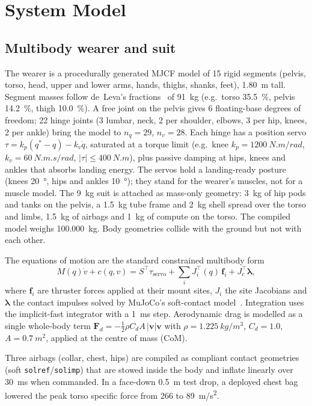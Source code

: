 \documentclass[conference]{IEEEtran}
\newcommand{\vect}[1]{\boldsymbol{#1}}
\begin{document}
\section{System Model}
\label{sec:model}

\subsection{Multibody wearer and suit}
The wearer is a procedurally generated MJCF model of 15 rigid segments (pelvis, torso, head, upper and lower arms, hands, thighs, shanks, feet), \SI{1.80}{m} tall. Segment masses follow de~Leva's fractions~\cite{deleva1996} of \SI{91}{kg} (e.g.\ torso \SI{35.5}{\%}, pelvis \SI{14.2}{\%}, thigh \SI{10.0}{\%}). A free joint on the pelvis gives 6 floating-base degrees of freedom; 22 hinge joints (3 lumbar, neck, 2 per shoulder, elbows, 3 per hip, knees, 2 per ankle) bring the model to $n_q=29$, $n_v=28$. Each hinge has a position servo $\tau = k_p(q^\ast-q) - k_v\dot q$, saturated at a torque limit (e.g.\ knee $k_p=\SI{1200}{N.m/rad}$, $k_v=\SI{60}{N.m.s/rad}$, $|\tau|\le\SI{400}{N.m}$), plus passive damping at hips, knees and ankles that absorbs landing energy. The servos hold a landing-ready posture (knees \SI{20}{\degree}, hips and ankles \SI{10}{\degree}); they stand for the wearer's muscles, not for a muscle model. The \SI{9}{kg} suit is attached as mass-only geometry: \SI{3}{kg} of hip pods and tanks on the pelvis, a \SI{1.5}{kg} tube frame and \SI{2}{kg} shell spread over the torso and limbs, \SI{1.5}{kg} of airbags and \SI{1}{kg} of compute on the torso. The compiled model weighs \SI{100.000}{kg}. Body geometries collide with the ground but not with each other.

The equations of motion are the standard constrained multibody form
\begin{equation}
M(q)\dot v + c(q,v) = S^{\top}\tau_{\text{servo}} + \sum_{i} J_i^{\top}(q)\,\vect f_i + J_c^{\top}\vect\lambda,
\label{eq:eom}
\end{equation}
where $\vect f_i$ are thruster forces applied at their mount sites, $J_i$ the site Jacobians and $\vect\lambda$ the contact impulses solved by MuJoCo's soft-contact model~\cite{todorov2012mujoco}. Integration uses the implicit-fast integrator with a \SI{1}{ms} step. Aerodynamic drag is modelled as a single whole-body term $\vect F_d=-\tfrac12\rho C_d A\,|\vect v|\vect v$ with $\rho=\SI{1.225}{kg/m^3}$, $C_d=1.0$, $A=\SI{0.7}{m^2}$, applied at the centre of mass (CoM).

Three airbags (collar, chest, hips) are compiled as compliant contact geometries (soft \texttt{solref}/\texttt{solimp}) that are stowed inside the body and inflate linearly over \SI{30}{ms} when commanded. In a face-down \SI{0.5}{m} test drop, a deployed chest bag lowered the peak torso specific force from 266 to \SI{89}{m/s^2}.
\end{document}
